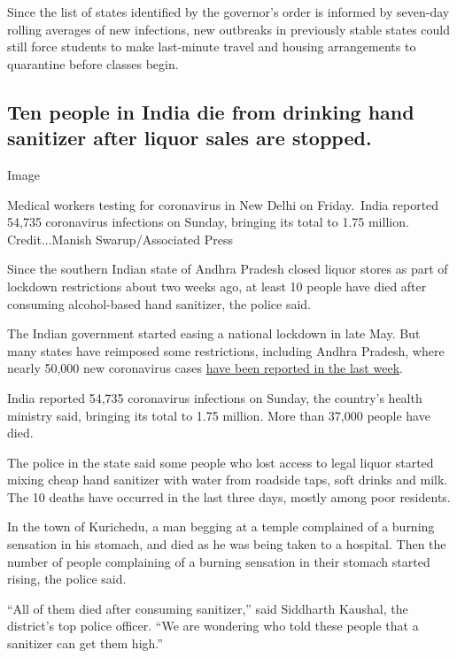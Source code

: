 Since the list of states identified by the governor's order is informed
by seven-day rolling averages of new infections, new outbreaks in
previously stable states could still force students to make last-minute
travel and housing arrangements to quarantine before classes begin.

\hypertarget{ten-people-in-india-die-from-drinking-hand-sanitizer-after-liquor-sales-are-stopped}{%
\subsection{Ten people in India die from drinking hand sanitizer after
liquor sales are
stopped.}\label{ten-people-in-india-die-from-drinking-hand-sanitizer-after-liquor-sales-are-stopped}}

Image

Medical workers testing for coronavirus in New Delhi on Friday.~India
reported 54,735 coronavirus infections on Sunday, bringing its total to
1.75 million. Credit...Manish Swarup/Associated Press

Since the southern Indian state of Andhra Pradesh closed liquor stores
as part of lockdown restrictions about two weeks ago, at least 10 people
have died after consuming alcohol-based hand sanitizer, the police said.

The Indian government started easing a national lockdown in late May.
But many states have reimposed some restrictions, including Andhra
Pradesh, where nearly 50,000 new coronavirus cases
\href{https://www.nytimes3xbfgragh.onion/interactive/2020/world/asia/india-coronavirus-cases.html\#cases}{have
been reported in the last week}.

India reported 54,735 coronavirus infections on Sunday, the country's
health ministry said, bringing its total to 1.75 million. More than
37,000 people have died.

The police in the state said some people who lost access to legal liquor
started mixing cheap hand sanitizer with water from roadside taps, soft
drinks and milk. The 10 deaths have occurred in the last three days,
mostly among poor residents.

In the town of Kurichedu, a man begging at a temple complained of a
burning sensation in his stomach, and died as he was being taken to a
hospital. Then the number of people complaining of a burning sensation
in their stomach started rising, the police said.

``All of them died after consuming sanitizer,'' said Siddharth Kaushal,
the district's top police officer. ``We are wondering who told these
people that a sanitizer can get them high.''

